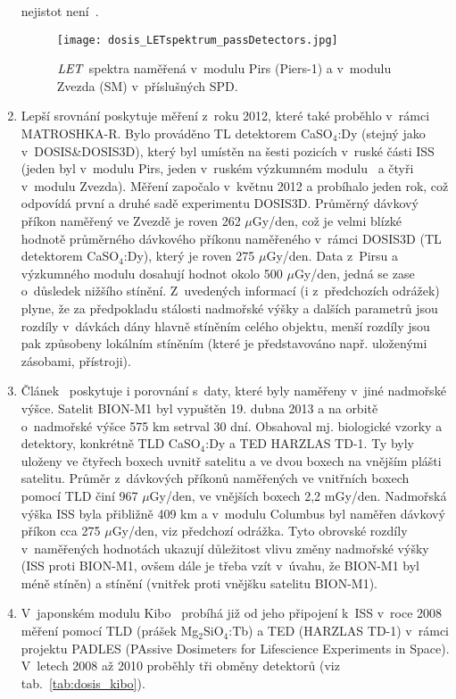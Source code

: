 \begin{enumerate}
nejistot není~\cite{passDetectors}.
\begin{figure}[h]
  \centering
  \texttt{[image: dosis\_LETspektrum\_passDetectors.jpg]}
  \caption{$\mathit{LET}$ spektra naměřená v~modulu Pirs (Piers-1) a v~modulu Zvezda (SM) v~příslušných SPD.~\cite{passDetectors}}
  \label{fig:dosis_passDetectors_LETspektrum}
\end{figure}
\item Lepší srovnání poskytuje měření z~roku 2012, které také proběhlo v~rámci MATROSHKA-R. Bylo prováděno TL detektorem CaSO$_4$:Dy (stejný jako v~DOSIS\&DOSIS3D), který byl umístěn na šesti pozicích v~ruské části ISS (jeden byl v~modulu Pirs, jeden v~ruském výzkumném modulu~\cite{researchModule} a čtyři v~modulu Zvezda). Měření započalo v~květnu 2012 a probíhalo jeden rok, což odpovídá první a druhé sadě experimentu DOSIS3D. Průměrný dávkový příkon naměřený ve Zvezdě je roven 262 $\mu$Gy/den, což je velmi blízké hodnotě průměrného dávkového příkonu naměřeného v~rámci DOSIS3D (TL detektorem CaSO$_4$:Dy), který je roven 275 $\mu$Gy/den. Data z~Pirsu a výzkumného modulu dosahují hodnot okolo 500 $\mu$Gy/den, jedná se zase o~důsledek nižšího stínění. Z~uvedených informací (i z~předchozích odrážek) plyne, že za předpokladu
  stálosti nadmořské výšky a dalších parametrů jsou rozdíly v~dávkách dány hlavně stíněním celého objektu, menší rozdíly jsou pak způsobeny lokálním stíněním (které je představováno např. uloženými zásobami, přístroji).~\cite{ambrozova_dvaExperimenty}
  \item Článek~\cite{ambrozova_dvaExperimenty} poskytuje i porovnání s~daty, které byly naměřeny v~jiné nadmořské výšce. Satelit BION-M1 byl vypuštěn 19. dubna 2013 a na orbitě o~nadmořské výšce 575 km setrval 30 dní. Obsahoval mj. biologické vzorky a detektory, konkrétně TLD CaSO$_4$:Dy a TED HARZLAS TD-1. Ty byly uloženy ve čtyřech boxech uvnitř satelitu a ve dvou boxech na vnějším plášti satelitu. Průměr z~dávkových příkonů naměřených ve vnitřních boxech pomocí TLD činí 967 $\mu$Gy/den, ve vnějších boxech 2,2 mGy/den. Nadmořská výška ISS byla přibližně 409 km a v~modulu Columbus byl naměřen dávkový příkon cca 275 $\mu$Gy/den, viz předchozí odrážka. Tyto obrovské rozdíly v~naměřených hodnotách ukazují důležitost vlivu změny nadmořské výšky (ISS proti BION-M1, ovšem dále je třeba vzít
	v~úvahu, že BION-M1 byl méně stíněn) a stínění (vnitřek proti vnějšku satelitu BION-M1).
  \item V~japonském modulu Kibo~\cite{kibo} probíhá již od jeho připojení k~ISS v~roce 2008 měření pomocí TLD (prášek Mg$_2$SiO$_4$:Tb) a TED (HARZLAS TD-1) v~rámci projektu PADLES (PAssive Dosimeters for Lifescience Experiments in Space). V~letech 2008 až 2010 proběhly tři obměny detektorů (viz tab.~\ref{tab:dosis_kibo}).

\end{enumerate}
